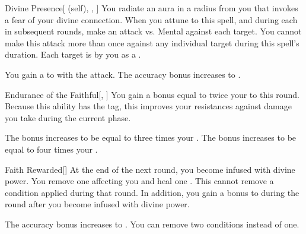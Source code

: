 \lowercase{\hypertarget{spell:Divine Presence}{}}\label{spell:Divine Presence}
\begin{attuneability}[Rank 3]{\hypertarget{spell:Divine Presence}{Divine Presence}}[ (self), , ]
You radiate an aura in a \areasmall radius  from you that invokes a fear of your divine connection.
When you attune to this spell, and during each  in subsequent rounds, make an attack vs. Mental against each target.
You cannot make this attack more than once against any individual target during this spell's duration.
\hit Each target is  by you as a .

\rankline
{} You gain a   to  with the attack.
 The accuracy bonus increases to .
\end{attuneability}
\vspace{0.25em}



\lowercase{\hypertarget{spell:Endurance of the Faithful}{}}\label{spell:Endurance of the Faithful}
\begin{freeability}[Rank 3]{\hypertarget{spell:Endurance of the Faithful}{Endurance of the Faithful}}[, ]
You gain a bonus equal to twice your  to  this round.
Because this ability has the  tag, this improves your resistances against damage you take during the current phase.

\rankline
{} The bonus increases to be equal to three times your .
 The bonus increases to be equal to four times your .
\end{freeability}
\vspace{0.25em}



\lowercase{\hypertarget{spell:Faith Rewarded}{}}\label{spell:Faith Rewarded}
\begin{freeability}[Rank 3]{\hypertarget{spell:Faith Rewarded}{Faith Rewarded}}[]
At the end of the next round, you become infused with divine power.
You remove one  affecting you and heal one .
This cannot remove a condition applied during that round.
In addition, you gain a  bonus to  during the round after you become infused with divine power.

\rankline
{} The accuracy bonus increases to .
 You can remove two conditions instead of one.
\end{freeability}
\vspace{0.25em}



